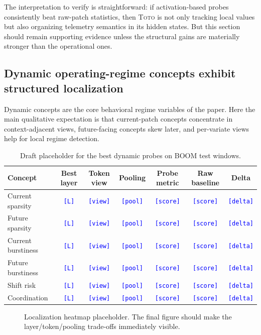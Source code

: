 \documentclass{article}
\newcommand{\tbd}[1]{\textcolor{blue}{\texttt{[#1]}}}
\newcommand{\model}{\textsc{Toto}}
\newcommand{\boom}{\textsc{BOOM}}
\begin{document}
The interpretation to verify is straightforward: if activation-based probes consistently beat raw-patch statistics, then \model{} is not only tracking local values but also organizing telemetry semantics in its hidden states. But this section should remain supporting evidence unless the structural gains are materially stronger than the operational ones.

\subsection{Dynamic operating-regime concepts exhibit structured localization}

Dynamic concepts are the core behavioral regime variables of the paper. Here the main qualitative expectation is that current-patch concepts concentrate in context-adjacent views, future-facing concepts skew later, and per-variate views help for local regime detection.

\begin{table}[t]
\centering
\small
\begin{tabularx}{\textwidth}{lcccccc}
\toprule
Concept & Best layer & Token view & Pooling & Probe metric & Raw baseline & Delta \\
\midrule
Current sparsity & \tbd{L} & \tbd{view} & \tbd{pool} & \tbd{score} & \tbd{score} & \tbd{delta} \\
Future sparsity & \tbd{L} & \tbd{view} & \tbd{pool} & \tbd{score} & \tbd{score} & \tbd{delta} \\
Current burstiness & \tbd{L} & \tbd{view} & \tbd{pool} & \tbd{score} & \tbd{score} & \tbd{delta} \\
Future burstiness & \tbd{L} & \tbd{view} & \tbd{pool} & \tbd{score} & \tbd{score} & \tbd{delta} \\
Shift risk & \tbd{L} & \tbd{view} & \tbd{pool} & \tbd{score} & \tbd{score} & \tbd{delta} \\
Coordination & \tbd{L} & \tbd{view} & \tbd{pool} & \tbd{score} & \tbd{score} & \tbd{delta} \\
\bottomrule
\end{tabularx}
\caption{Draft placeholder for the best dynamic probes on \boom{} test windows.}
\label{tab:dynamic}
\end{table}

\begin{figure}[t]
\centering
{}
\caption{Localization heatmap placeholder. The final figure should make the layer/token/pooling trade-offs immediately visible.}
\label{fig:heatmap}
\end{figure}
\end{document}
